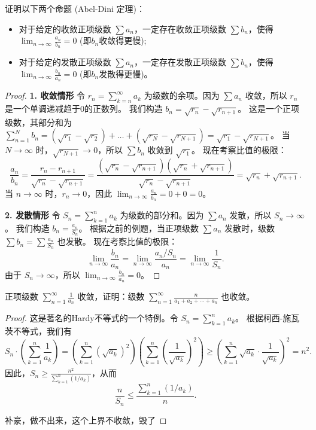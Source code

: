 \documentclass[lang=cn,10pt,thmcnt=section]{elegantbook}
\begin{document}
\begin{example}
    证明以下两个命题 (Abel-Dini 定理)：
    \begin{itemize}
        \item 对于给定的收敛正项级数 $\sum a_n$，一定存在收敛正项级数 $\sum b_n$，使得 $\lim_{n \to \infty} \frac{a_n}{b_n} = 0$ (即$b_n$收敛得更慢);
        \item 对于给定的发散正项级数 $\sum a_n$，一定存在发散正项级数 $\sum b_n$，使得 $\lim_{n \to \infty} \frac{b_n}{a_n} = 0$ (即$b_n$发散得更慢)。
    \end{itemize}
\end{example}
\begin{proof}
    \textbf{1. 收敛情形}
    令 $r_n = \sum_{k=n}^{\infty} a_k$ 为级数的余项。因为 $\sum a_n$ 收敛，所以 $r_n$ 是一个单调递减趋于0的正数列。
    我们构造 $b_n = \sqrt{r_n} - \sqrt{r_{n+1}}$。
    这是一个正项级数，其部分和为 $\sum_{n=1}^N b_n = (\sqrt{r_1} - \sqrt{r_2}) + \dots + (\sqrt{r_N} - \sqrt{r_{N+1}}) = \sqrt{r_1} - \sqrt{r_{N+1}}$。
    当 $N\to\infty$ 时，$\sqrt{r_{N+1}} \to 0$，所以 $\sum b_n$ 收敛到 $\sqrt{r_1}$。
    现在考察比值的极限：
    \[ \frac{a_n}{b_n} = \frac{r_n - r_{n+1}}{\sqrt{r_n} - \sqrt{r_{n+1}}} = \frac{(\sqrt{r_n} - \sqrt{r_{n+1}})(\sqrt{r_n} + \sqrt{r_{n+1}})}{\sqrt{r_n} - \sqrt{r_{n+1}}} = \sqrt{r_n} + \sqrt{r_{n+1}}. \]
    当 $n \to \infty$ 时，$r_n \to 0$，因此 $\lim_{n \to \infty} \frac{a_n}{b_n} = 0 + 0 = 0$。
    
    \textbf{2. 发散情形}
    令 $S_n = \sum_{k=1}^n a_k$ 为级数的部分和。因为 $\sum a_n$ 发散，所以 $S_n \to \infty$。
    我们构造 $b_n = \frac{a_n}{S_n}$。
    根据之前的例题，当正项级数 $\sum a_n$ 发散时，级数 $\sum b_n = \sum \frac{a_n}{S_n}$ 也发散。
    现在考察比值的极限：
    \[ \lim_{n \to \infty} \frac{b_n}{a_n} = \lim_{n \to \infty} \frac{a_n/S_n}{a_n} = \lim_{n \to \infty} \frac{1}{S_n}. \]
    由于 $S_n \to \infty$，所以 $\lim_{n \to \infty} \frac{b_n}{a_n} = 0$。
\end{proof}

\begin{example}
    正项级数 $\sum_{n=1}^{\infty} \frac{1}{a_n}$ 收敛，证明：级数 $\sum_{n=1}^{\infty} \frac{n}{a_1 + a_2 + \cdots + a_n}$ 也收敛。
\end{example}
\begin{proof}
    这是著名的Hardy不等式的一个特例。令 $S_n = \sum_{k=1}^n a_k$。
    根据柯西-施瓦茨不等式，我们有
    \[ S_n \cdot \left(\sum_{k=1}^n \frac{1}{a_k}\right) = \left(\sum_{k=1}^n (\sqrt{a_k})^2\right) \left(\sum_{k=1}^n \left(\frac{1}{\sqrt{a_k}}\right)^2\right) \ge \left(\sum_{k=1}^n \sqrt{a_k} \cdot \frac{1}{\sqrt{a_k}}\right)^2 = n^2. \]
    因此，$S_n \ge \frac{n^2}{\sum_{k=1}^n (1/a_k)}$，从而
    \[ \frac{n}{S_n} \le \frac{\sum_{k=1}^n (1/a_k)}{n}. \]

	补豪，做不出来，这个上界不收敛，毁了
    \end{proof}
\end{document}
